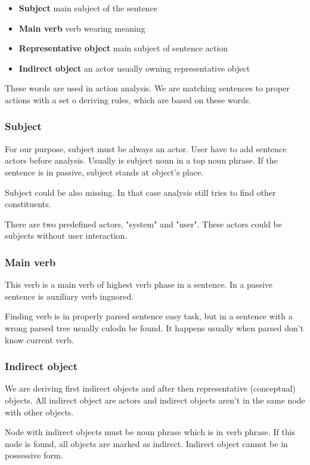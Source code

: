 \begin{itemize}
\item {\bf Subject} main subject of the sentence
\item {\bf Main verb} verb wearing meaning
\item {\bf Representative object} main subject of sentence action
\item {\bf Indirect object} an actor usually owning representative object
\end{itemize}

These words are used in action analysis. We are matching sentences to proper actions with a set o deriving rules, which are based on these words. 
                                                                    
\subsubsection{Subject}
For our purpose, subject must be always an actor. User have to add sentence actors before analysis. Usually is subject noun in a top noun phrase. If the sentence is in passive, subject stands at object's place. 

Subject could be also missing. In that case analysis still tries to find other constituents.

There are two predefined actors, "system" and "user". These actors could be subjects without user interaction.

\subsubsection{Main verb}
This verb is a main verb of highest verb phase in a sentence. In a passive sentence is auxiliary verb ingnored. 

Finding verb is in properly parsed sentence easy task, but in a sentence with a wrong parsed tree usually culodn be found. It happens usually when parsed don't know current verb.

\subsubsection{Indirect object}
We are deriving first indirect objects and after then representative (conceptual) objects. All indirect object are actors and indirect objects aren't in the same node with other objects.

Node with indirect objects must be noun phrase which is in verb phrase. If this node is found, all objects are marked as indirect. Indirect object cannot be in possessive form.  


